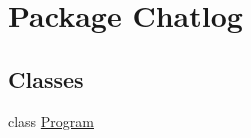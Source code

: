 \hypertarget{namespace_chatlog}{\section{Package Chatlog}
\label{namespace_chatlog}
}
\subsection*{Classes}
\begin{DoxyCompactItemize}
\item 
class \hyperlink{class_chatlog_1_1_program}{Program}
\end{DoxyCompactItemize}
